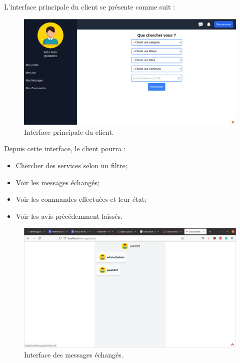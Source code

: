 \documentclass[french]{report}
\begin{document}
            L'interface principale du client se présente comme suit :
            \begin{figure}[H]
                \centering
                \includegraphics[width=1\textwidth]{images/client dash.png}
                \caption{Interface principale du client.}
            \end{figure}
            
            Depuis cette interface, le client pourra :
            \begin{itemize}
                \item Chercher des services selon un filtre;
                \item Voir les messages échangés;
                \item Voir les commandes effectuées et leur état;
                \item Voir les avis précédemment laissés.
            \end{itemize}
            
            \begin{figure}[H]
                \centering
                \includegraphics[width=1\textwidth]{images/messages.png}
                \caption{Interface des messages échangés.}
            \end{figure}
            
\end{document}

